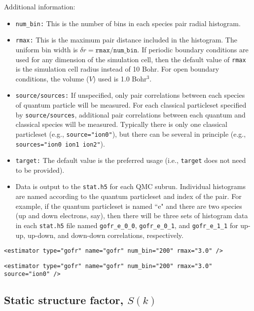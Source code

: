 Additional information:
\begin{itemize}
  \item{\texttt{num\_bin:} This is the number of bins in each species pair radial histogram.}
  \item{\texttt{rmax:} This is the maximum pair distance included in the histogram.  The uniform bin width is $\delta r=\texttt{rmax/num\_bin}$.  If periodic boundary conditions are used for any dimension of the simulation cell, then the default value of \texttt{rmax} is the simulation cell radius instead of 10 Bohr.  For open boundary conditions, the volume ($V$) used is 1.0 Bohr$^3$.}
  \item{\texttt{source/sources:} If unspecified, only pair correlations between each species of quantum particle will be measured.  For each classical particleset specified by \texttt{source/sources}, additional pair correlations between each quantum and classical species will be measured.  Typically there is only one classical particleset (e.g., \texttt{source="ion0"}), but there can be several in principle (e.g., \texttt{sources="ion0 ion1 ion2"}).}
  \item{\texttt{target:} The default value is the preferred usage (i.e., \texttt{target} does not need to be provided).}
  \item{Data is output to the \texttt{stat.h5} for each QMC subrun.  Individual histograms are named according to the quantum particleset and index of the pair.  For example, if the quantum particleset is named ``e" and there are two species (up and down electrons, say), then there will be three sets of histogram data in each \texttt{stat.h5} file named \texttt{gofr\_e\_0\_0},  \texttt{gofr\_e\_0\_1}, and  \texttt{gofr\_e\_1\_1} for up-up, up-down, and down-down correlations, respectively.}
\end{itemize}

\begin{lstlisting}[style=QMCPXML,caption=Pair correlation function estimator element.]
  <estimator type="gofr" name="gofr" num_bin="200" rmax="3.0" />
\end{lstlisting}
\begin{lstlisting}[style=QMCPXML,caption=Pair correlation function estimator element with additional electron-ion correlations.]
  <estimator type="gofr" name="gofr" num_bin="200" rmax="3.0" source="ion0" />
\end{lstlisting}


\subsection{Static structure factor, $S(k)$}

